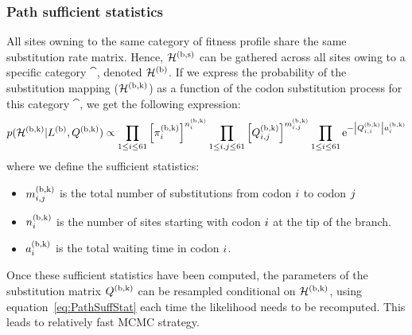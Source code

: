 \subsubsection{Path sufficient statistics}
All sites owning to the same category of fitness profile share the same substitution rate matrix.
Hence, $\mathcal{H}^{(\text{b}, \text{s})}$ can be gathered across all sites owing to a specific category $\cat$, denoted $\mathcal{H}^{(\text{b})}$.
If we express the probability of the substitution mapping ($\mathcal{H}^{(\text{b}, \text{k})}$) as a function of the codon substitution process for this category $\cat$, we get the following expression:
\begin{equation}
\label{eq:PathSuffStat}
p(\mathcal{H}^{(\text{b}, \text{k})} | L^{(\text{b})}, Q^{(\text{b}, \text{k})}) \propto \prod_{1 \leq {i} \leq 61} \left[\pi_{{i}}^{(\text{b}, \text{k})}\right]^{n_{{i}}^{(\text{b}, \text{k})}} \prod_{ 1 \leq {i}, {j} \leq 61} \left[Q^{(\text{b}, \text{k})}_{{i}, {j}}\right]^{m_{{i}, {j}}^{(\text{b}, \text{k})}} \prod_{1 \leq {i} \leq 61} \mathrm{e}^{- \left|  Q^{(\text{b}, \text{k})}_{{i}, {i}}\right| a_{{i}}^{(\text{b}, \text{k})}}
\end{equation}
where we define the sufficient statistics:
\begin{itemize}
	\setlength\itemsep{-0.25em}
	\item $m_{{i}, {j}}^{(\text{b}, \text{k})}$ is the total number of substitutions from codon ${i}$ to codon ${j}$
	\item $n_{{i}}^{(\text{b}, \text{k})}$ is the number of sites starting with codon ${i}$ at the tip of the branch.
	\item $a_{{i}}^{(\text{b}, \text{k})}$ is the total waiting time in codon ${i}$.
\end{itemize}
Once these sufficient statistics have been computed, the parameters of the substitution matrix $Q^{(\text{b}, \text{k})}$ can be resampled conditional on $\mathcal{H}^{(\text{b}, \text{k})}$, 
using equation~\ref{eq:PathSuffStat} each time the likelihood needs to be recomputed. This leads to relatively fast MCMC strategy.
